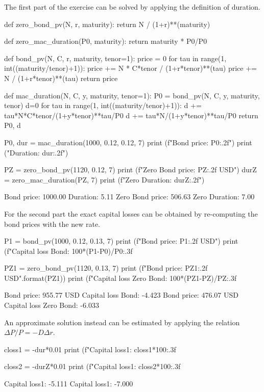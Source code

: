 \cprotEnv\begin{solution}
The first part of the exercise can be solved by applying the definition of duration.
\begin{ipython}
def zero_bond_pv(N, r, maturity):
    return N / (1+r)**(maturity)

def zero_mac_duration(P0, maturity): 
    return maturity * P0/P0 

def bond_pv(N, C, r, maturity, tenor=1):
    price = 0
    for tau in range(1, int((maturity/tenor)+1)):
        price += N * C*tenor / (1+r*tenor)**(tau)
    price += N / (1+r*tenor)**(tau)
    return price

def mac_duration(N, C, y, maturity, tenor=1): 
    P0 = bond_pv(N, C, y, maturity, tenor)
    d=0
    for tau in range(1, int((maturity/tenor)+1)):
        d += tau*N*C*tenor/(1+y*tenor)**tau/P0
    d += tau*N/(1+y*tenor)**tau/P0 
    return P0, d

P0, dur = mac_duration(1000, 0.12, 0.12, 7)
print (f"Bond price: {P0:.2f}")
print ("Duration: {dur:.2f}")

PZ = zero_bond_pv(1120, 0.12, 7) 
print (f"Zero Bond price: {PZ:.2f} USD")
durZ = zero_mac_duration(PZ, 7)
print (f"Zero Duration: {durZ:.2f}")
\end{ipython}
\begin{ioutput}
Bond price: 1000.00
Duration: 5.11
Zero Bond price: 506.63
Zero Duration: 7.00
\end{ioutput}

For the second part the exact capital losses can be obtained by re-computing the bond prices with the new rate.

\begin{ipython}
P1 = bond_pv(1000, 0.12, 0.13, 7)
print (f"Bond price: {P1:.2f} USD")
print (f"Capital loss Bond: {100*(P1-P0)/P0:.3f}%

PZ1 = zero_bond_pv(1120, 0.13, 7) 
print (f"Bond price: {PZ1:.2f} USD".format(PZ1))
print (f"Capital loss Zero Bond: {100*(PZ1-PZ)/PZ:.3f}%
\end{ipython}
\begin{ioutput}
Bond price: 955.77 USD
Capital loss Bond: -4.423%
Bond price: 476.07 USD
Capital loss Zero Bond: -6.033%
\end{ioutput}

An approximate solution instead can be estimated by applying the relation $\Delta P/P = -D\Delta r$.
\begin{ipython}
closs1 = -dur*0.01
print (f"Capital loss1: {closs1*100:.3f}%

closs2 = -durZ*0.01
print (f"Capital loss1: {closs2*100:.3f}%
\end{ipython}
\begin{ioutput}
Capital loss1: -5.111%
Capital loss1: -7.000%
\end{ioutput}
\end{solution}

